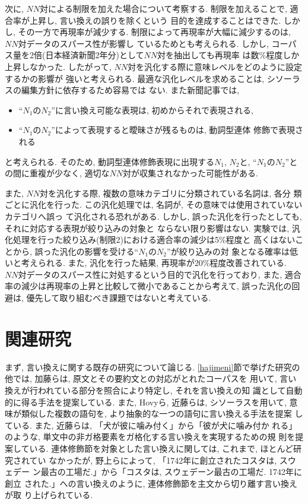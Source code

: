 次に, $NN対$による制限を加えた場合について考察する.
制限を加えることで, 適合率が上昇し, 言い換えの誤りを除くという
目的を達成することはできた. 
しかし, その一方で再現率が減少する.
制限によって再現率が大幅に減少するのは, $NN対$データのスパース性が影響し
ているためとも考えられる.
しかし, コーパス量を2倍(日本経済新聞2年分)として$NN$対を抽出しても再現率
は数\%程度しか上昇しなかった.
したがって, $NN対$を汎化する際に意味レベルをどのように設定するかの影響が
強いと考えられる.
最適な汎化レベルを求めることは, シソーラスの編集方針に依存するため容易では
ない.
また新聞記事では, 
\begin{itemize}
 \item ``$N_1$の$N_2$''に言い換え可能な表現は, 初めからそれで表現される, 
 \item ``$N_1$の$N_2$''によって表現すると曖昧さが残るものは, 動詞型連体
       修飾で表現される
\end{itemize}
と考えられる.
そのため, 動詞型連体修飾表現に出現する$N_1$, $N_2$と, ``$N_1$の$N_2$''と
の間に重複が少なく,  適切な$NN対$が収集されなかった可能性がある.

また, $NN対$を汎化する際, 複数の意味カテゴリに分類されている名詞は, 各分
類ごとに汎化を行った. 
この汎化処理では, 名詞が, その意味では使用されていないカテゴリへ誤っ
て汎化される恐れがある.
しかし, 誤った汎化を行ったとしても, それに対応する表現が絞り込みの対象と
ならない限り影響はない.
実験では, 汎化処理を行った絞り込み(制限2)における適合率の減少は5\%程度と
高くはないことから, 誤った汎化の影響を受ける``$N_1のN_2$''が絞り込みの対
象となる確率は低いと考えられる.
また, 汎化を行った結果, 再現率が20\%程度改善されている.
$NN対$データのスパース性に対処するという目的で汎化を行っており, また, 
適合率の減少は再現率の上昇と比較して微小であることから考えて,
誤った汎化の回避は, 優先して取り組むべき課題ではないと考えている.

\section{関連研究}\label{kanren}
まず, 言い換えに関する既存の研究について論じる.
{}\ref{hajimeni}節で挙げた研究の他では, 
加藤ら\cite{kato99}は, 原文とその要約文との対応がとれたコーパスを
用いて, 言い換えが行われている部分を照合により特定し, それを言い換えの知 
識として自動的に得る手法を提案している.
また, Hovyら\cite{hovy97}, 近藤ら\cite{kondo96}は, シソーラスを用いて, 
意味が類似した複数の語句を, より抽象的な一つの語句に言い換える手法を提案
している.
また, 近藤ら\cite{kondo00}は, 「犬が彼に噛み付く」から「彼が犬に噛み付か
れる」のような, 単文中の非ガ格要素をガ格化する言い換えを実現するための規
則を提案している.
連体修飾節を対象とした言い換えに関しては, これまで, ほとんど研究されてい
なかったが, 
野上ら\cite{nogami00}によって, 「1742年に創立されたコスタは, スウェデー
ン最古の工場だ.」から「コスタは, スウェデーン最古の工場だ. 1742年に創立
された.」への言い換えのように, 連体修飾節を主文から切り離す言い換えが取
り上げられている.


